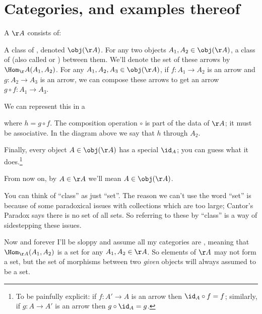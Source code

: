 \section{Categories, and examples thereof}
\begin{definition}
	A  $\AA$ consists of:
	\begin{itemize}
		\ii A class of , denoted $\obj(\AA)$.
		\ii For any two objects $A_1, A_2 \in \obj(\AA)$,
		a class of  (also called  or ) between them.
		We'll denote the set of these arrows by $\Hom_\AA(A_1, A_2)$.
		\ii For any $A_1, A_2, A_3 \in \obj(\AA)$,
		if $f \colon A_1 \to A_2$ is an arrow and $g \colon A_2 \to A_3$ is an arrow,
		we can compose these arrows to get an arrow $g \circ f \colon A_1 \to A_3$.

		We can represent this in a 
		\begin{center}
		\end{center}
		where $h = g \circ f$.
		The composition operation $\circ$ is part of the data of $\AA$;
		it must be associative.
		In the diagram above we say that $h$  through $A_2$.

		\ii Finally, every object $A \in \obj(\AA)$ has a special  $\id_A$;
		you can guess what it does.\footnote{To be painfully explicit:
			if $f \colon A' \to A$ is an arrow then $\id_A \circ f = f$;
		similarly, if $g \colon A \to A'$ is an arrow then $g \circ \id_A = g$.}
	\end{itemize}
\end{definition}
\begin{abuse}
	From now on, by $A \in \AA$ we'll mean $A \in \obj(\AA)$.
\end{abuse}
\begin{abuse}
	You can think of ``class'' as just ``set''.
	The reason we can't use the word ``set'' is
	because of some paradoxical issues with
	collections which are too large;
	Cantor's Paradox says there is no set of all sets.
	So referring to these by ``class'' is a way of sidestepping these issues.

	Now and forever I'll be sloppy and assume all my categories
	are , meaning that $\Hom_{\AA} (A_1, A_2)$
	is a set for any $A_1, A_2 \in \AA$.
	So elements of $\AA$ may not form a set,
	but the set of morphisms between
	two \emph{given} objects will always assumed to be a set.
\end{abuse}

